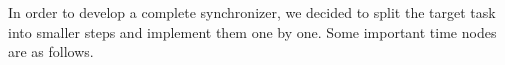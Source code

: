 \noindent In order to develop a complete synchronizer, we decided to split the target task into smaller steps and implement them one by one. Some important time nodes are as follows.






   


